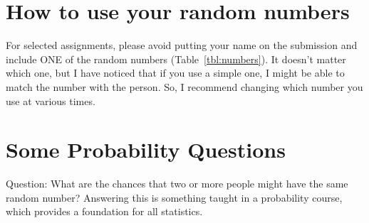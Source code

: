 \documentclass{article}\usepackage[]{graphicx}\usepackage[]{xcolor}
\begin{document}
\section*{How to use your random numbers}

For selected assignments, please avoid putting your name on the submission and include ONE of the random numbers (Table~\ref{tbl:numbers}). It doesn't matter which one, but I have noticed that if you use a simple one, I might be able to match the number with the person. So, I recommend changing which number you use at various times.

\section*{Some Probability Questions}

Question: What are the chances that two or more people might have the same random number?  Answering this is something taught in a probability course, which provides a foundation for all statistics.
\end{document}
